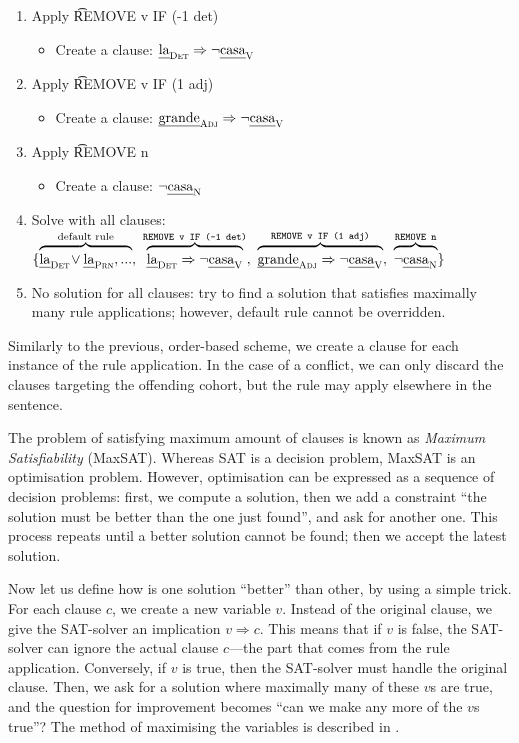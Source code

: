 \begin{enumerate}
\item Apply \t{REMOVE v IF (-1 det)}
 \begin{itemize}
    \item Create a clause: $\text{\em la}_{\text{\sc Det}} \Rightarrow \neg \text{\em casa}_{\text{\sc V}}$
 \end{itemize}
\item Apply \t{REMOVE v IF (1 adj)} 
 \begin{itemize}
    \item Create a clause: $\text{\em grande}_{\text{\sc Adj}} \Rightarrow \neg \text{\em casa}_{\text{\sc V}}$
 \end{itemize}
\item Apply \t{REMOVE n}
 \begin{itemize}
    \item Create a clause: $\neg \text{\em casa}_{\text{\sc N}}$
 \end{itemize}

\item Solve with all clauses:
  $\{ \ob{\laDet \! \vee \laPrn, ...}^{\text{default rule}}, \ 
      \ob{\laDet \Rightarrow \neg \casaV}^{\t{REMOVE v IF (-1 det)}}, \ 
      \ob{\grandeAdj \Rightarrow \neg \casaV}^{\t{REMOVE v IF (1 adj)}}, \ 
      \ob{\neg \casaN}^{\t{REMOVE n}} \}$
\item No solution for all clauses: try to find a solution that satisfies maximally many rule applications; however, default rule cannot be overridden.
\end{enumerate}

Similarly to the previous, order-based scheme, we create a clause for each 
instance of the rule application. In the case of a conflict, we can 
only discard the clauses targeting the offending cohort, but the rule may apply 
elsewhere in the sentence.


The problem of satisfying maximum amount of clauses is known as \emph{Maximum Satisfiability} (MaxSAT).
Whereas SAT is a decision problem, MaxSAT is an optimisation problem.
However, optimisation can be expressed as a sequence of decision problems:
first, we compute a solution, then we add a constraint ``the solution must be better than the one just found'', and ask for another one. 
This process repeats until a better solution cannot be found; then we accept the 
latest solution.

Now let us define how is one solution ``better'' than other,
by using a simple trick. 
For each clause $c$, we create a new variable $v$. 
Instead of the original clause, we give the SAT-solver 
an implication $v \Rightarrow c$. 
This means that if $v$ is false, the SAT-solver can ignore the 
actual clause $c$---the part that comes from the rule application.
Conversely, if $v$ is true, then the SAT-solver must handle
the original clause.
Then, we ask for a solution where maximally many of these $v$s are true,
and the question for improvement becomes ``can we make any more of the $v$s true''?
The method of maximising the variables is described in \citet{een06minisatplus}.

